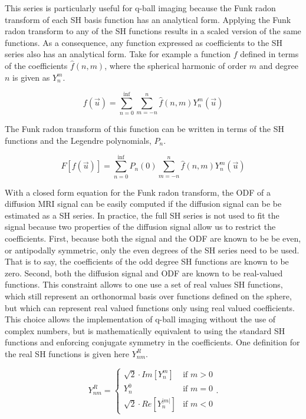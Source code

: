 This series is particularly useful for q-ball imaging because the Funk radon transform of each SH basis function has an analytical form. Applying the Funk radon transform to any of the SH functions results in a scaled version of the same functions. As a consequence, any function expressed as coefficients to the SH series also has an analytical form. Take for example a function $f$ defined in terms of the coefficients $\hat{f}(n, m)$, where the spherical harmonic of order $m$ and degree $n$ is given as $Y_n^m$.
    
\begin{equation}
f(\vec{u}) = \sum_{n=0}^{\inf}\sum_{m=-n}^{n}{\hat{f}(n, m) Y_n^m(\vec{u})}
\end{equation}

The Funk radon transform of this function can be written in terms of the SH functions and the Legendre polynomials, $P_n$.

\begin{equation}
F[f(\vec{u})] = \sum_{n=0}^{\inf}P_n(0)\sum_{m=-n}^{n}{\hat{f}(n, m)  Y_n^m(\vec{u})}
\end{equation}

With a closed form equation for the Funk radon transform, the ODF of a diffusion MRI signal can be easily computed if the diffusion signal can be be estimated as a SH series. In practice, the full SH series is not used to fit the signal because two properties of the diffusion signal allow us to restrict the coefficients. First, because both the signal and the ODF are known to be be even, or antipodally symmetric, only the even degrees of the SH series need to be used. That is to say, the coefficients of the odd degree SH functions are known to be zero. Second, both the diffusion signal and ODF are known to be real-valued functions. This constraint allows to one use a set of real values SH functions, which still represent an orthonormal basis over functions defined on the sphere, but which can represent real valued functions only using real valued coefficients. This choice allows the implementation of q-ball imaging without the use of complex numbers, but is mathematically equivalent to using the standard SH functions and  enforcing conjugate symmetry in the coefficients. One definition for the real SH functions is given here $Y^R_{nm}$.

\begin{equation}
\label{eqn:realSH}
Y^R_{nm} = \begin{cases} \sqrt{2} \cdot Im[Y_n^m] &\mbox{if } m > 0 \\
Y_n^0 &\mbox{if } m = 0 \\
\sqrt{2} \cdot Re[Y_n^{|m|}] &\mbox{if } m < 0 \end{cases}.
\end{equation}

